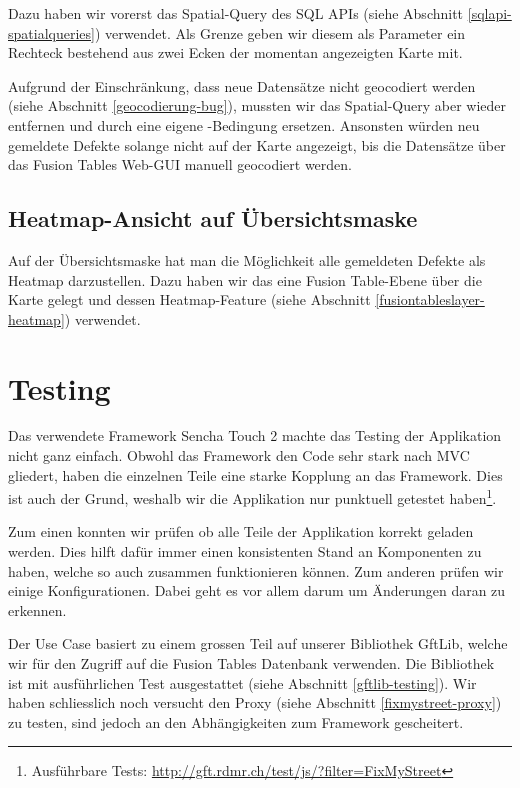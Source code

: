 Dazu haben wir vorerst das Spatial-Query  des SQL \gls{API}s (siehe Abschnitt \ref{sqlapi-spatialqueries}) verwendet. Als Grenze geben wir diesem als Parameter ein Rechteck bestehend aus zwei Ecken der momentan angezeigten Karte mit.

Aufgrund der Einschränkung, dass neue Datensätze nicht geocodiert werden (siehe Abschnitt \ref{geocodierung-bug}), mussten wir das Spatial-Query aber wieder entfernen und durch eine eigene -Bedingung ersetzen. Ansonsten würden neu gemeldete Defekte solange nicht auf der Karte angezeigt, bis die Datensätze über das Fusion Tables Web-GUI manuell geocodiert werden.

\subsection{Heatmap-Ansicht auf Übersichtsmaske}
\label{fixmystreet-heatmap}
Auf der Übersichtsmaske hat man die Möglichkeit alle gemeldeten Defekte als Heatmap darzustellen. Dazu haben wir das eine Fusion Table-Ebene über die Karte gelegt und dessen Heatmap-Feature (siehe Abschnitt \ref{fusiontableslayer-heatmap}) verwendet. 

\section{Testing}
Das verwendete Framework Sencha Touch 2 machte das Testing der Applikation nicht ganz einfach. Obwohl das Framework den Code sehr stark nach MVC gliedert, haben die einzelnen Teile eine starke Kopplung an das Framework. Dies ist auch der Grund, weshalb wir die Applikation nur punktuell getestet haben\footnote{Ausführbare Tests: \url{http://gft.rdmr.ch/test/js/?filter=FixMyStreet}}.

Zum einen konnten wir prüfen ob alle Teile der Applikation korrekt geladen werden. Dies hilft dafür immer einen konsistenten Stand an Komponenten zu haben, welche so auch zusammen funktionieren können. Zum anderen prüfen wir einige Konfigurationen. Dabei geht es vor allem darum um Änderungen daran zu erkennen.

Der Use Case basiert zu einem grossen Teil auf unserer Bibliothek GftLib, welche wir für den Zugriff auf die Fusion Tables Datenbank verwenden. Die Bibliothek ist mit ausführlichen Test ausgestattet (siehe Abschnitt \ref{gftlib-testing}). Wir haben schliesslich noch versucht den Proxy (siehe Abschnitt \ref{fixmystreet-proxy}) zu testen, sind jedoch an den Abhängigkeiten zum Framework gescheitert.

